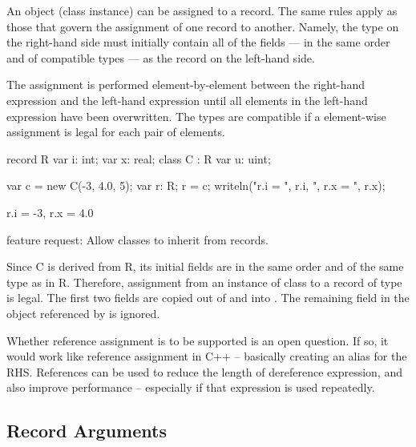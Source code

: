 An object (class instance) can be assigned to a record.  The same rules apply as
those that govern the assignment of one record to another.  Namely, the type on
the right-hand side must initially contain all of the fields --- in the same
order and of compatible types --- as the record on the left-hand side.

The assignment is performed element-by-element between the right-hand expression
and the left-hand expression until all elements in the left-hand expression have
been overwritten.  The types are compatible if a element-wise assignment is
legal for each pair of elements.

\begin{example}
\begin{chapelpre}
\end{chapelpre}
\begin{chapel}
record R {
  var i: int;
  var x: real;
}
class C : R {
  var u: uint;
}

var c = new C(-3, 4.0, 5);
var r: R;
r = c;
writeln("r.i = ", r.i, ", r.x = ", r.x);
\end{chapel}
\begin{chapeloutput}
r.i = -3, r.x = 4.0
\end{chapeloutput}
\begin{chapelfuture}
feature request: Allow classes to inherit from records.
\end{chapelfuture}
\end{example}

Since C is derived from R, its initial fields are in the same order and of the
same type as in R.  Therefore, assignment from an instance of class  to
a record of type  is legal.
The first two fields are copied out of  and into .  The
remaining field in the object referenced by  is ignored.

\begin{openissue}
Whether reference assignment is to be supported is an open question.
If so, it would work like reference assignment in C++ -- basically creating an
alias for the RHS.
References can be used to reduce the length of dereference expression, and also
improve performance -- especially if that expression is used repeatedly.
\end{openissue}

\subsection{Record Arguments}
\label{Record_Arguments}


